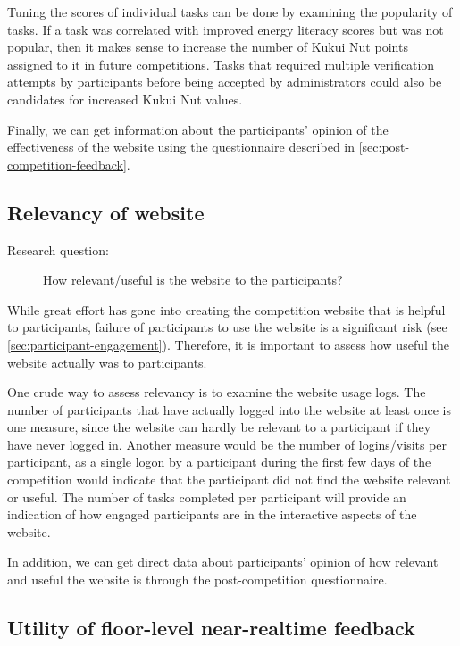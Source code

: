 Tuning the scores of individual tasks can be done by examining the popularity of tasks. If a task was correlated with improved energy literacy scores but was not popular, then it makes sense to increase the number of Kukui Nut points assigned to it in future competitions. Tasks that required multiple verification attempts by participants before being accepted by administrators could also be candidates for increased Kukui Nut values.

Finally, we can get information about the participants' opinion of the effectiveness of the website using the questionnaire described in \autoref{sec:post-competition-feedback}.

\subsection{Relevancy of website}

\begin{description}
\item[Research question:] How relevant/useful is the website to the participants?
\end{description}

While great effort has gone into creating the competition website that is helpful to participants, failure of participants to use the website is a significant risk (see \autoref{sec:participant-engagement}). Therefore, it is important to assess how useful the website actually was to participants.

One crude way to assess relevancy is to examine the website usage logs. The number of participants that have actually logged into the website at least once is one measure, since the website can hardly be relevant to a participant if they have never logged in. Another measure would be the number of logins/visits per participant, as a single logon by a participant during the first few days of the competition would indicate that the participant did not find the website relevant or useful. The number of tasks completed per participant will provide an indication of how engaged participants are in the interactive aspects of the website.

In addition, we can get direct data about participants' opinion of how relevant and useful the website is through the post-competition questionnaire.

\subsection{Utility of floor-level near-realtime feedback}

